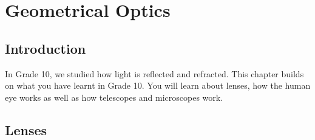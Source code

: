 \chapter{Geometrical Optics}
\label{p:wsl:go11}

\section{Introduction}
In Grade 10, we studied how light is reflected and refracted. This chapter builds on what you have learnt in Grade 10. You will learn about lenses, how the human eye works as well as how telescopes and microscopes work.\\
\section{Lenses}

